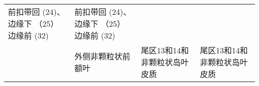\begin{table}[htbp]
\begin{tabular}{llll}
		\midrule
		 \tabincell{c}{前扣带回 (24)、边缘下 （25） \\边缘前 (32)} & \tabincell{c}{前扣带回 (24)、边缘下 （25） \\边缘前 (32)}\\
		&外侧非颗粒状前额叶 & 尾区13和14和非颗粒状岛叶皮质 & 尾区13和14和非颗粒状岛叶皮质\\
		\bottomrule
	\end{tabular}%
\end{table}%